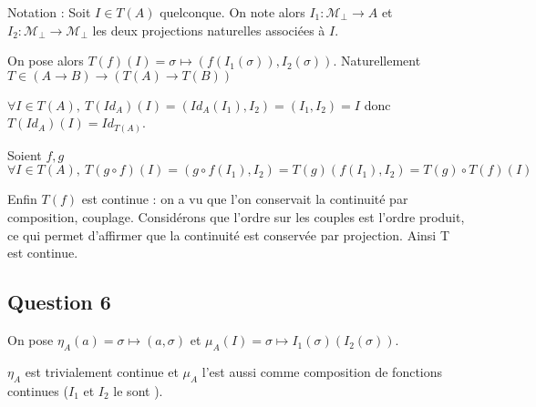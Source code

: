 \documentclass{article}
\newcommand{\M}{\mathcal{M}}
\begin{document}
Notation : Soit $I \in T\left (A\right )$ quelconque. On note alors $I_1 : \M_\bot \rightarrow A$ et $I_2 : \M_\bot \rightarrow \M_\bot$ les deux projections naturelles associées à $I$.

On pose alors $T\left (f\right )\left (I\right ) = \sigma \mapsto \left (f\left (I_1\left (\sigma\right )\right ), I_2\left (\sigma\right )\right )$. Naturellement $T\in \left (A \rightarrow B\right ) \rightarrow \left (T\left (A\right )\rightarrow T\left (B\right )\right )$

$\forall I\in T\left (A\right ), \ T\left (Id_A\right )\left (I\right )=\left (Id_A\left (I_1\right ),I_2\right )=\left (I_1,I_2\right )=I$ donc $T\left (Id_A\right )\left (I\right )=Id_{T\left (A\right )}$.

Soient $f,g$ $\forall I\in T\left (A\right ),\ T\left (g\circ f\right )\left (I\right )=\left (g\circ f\left (I_1\right ),I_2\right )=T\left (g\right )\left (f\left (I_1\right ),I_2\right )=T\left (g\right )\circ T\left (f\right )\left (I\right )$

Enfin $T\left (f\right )$ est continue : on a vu que l'on conservait la continuité par composition, couplage. Considérons que l'ordre sur les couples est l'ordre produit, ce qui permet d'affirmer que la continuité est conservée par projection. Ainsi T est continue.


\subsection*{Question 6}

On pose $\eta_A\left (a\right ) = \sigma \mapsto \left (a, \sigma\right )$ et $\mu_A\left (I\right ) = \sigma \mapsto I_1\left (\sigma\right )\left (I_2\left (\sigma\right )\right )$. 

$\eta_A$ est trivialement continue et $\mu_A$ l'est aussi comme composition de fonctions continues  ($I_1$ et $I_2$ le sont ).
\end{document}
